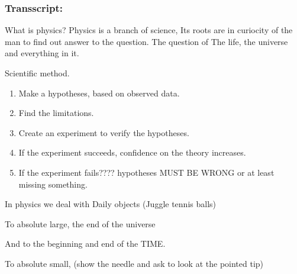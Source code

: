 \documentclass[11pt]{article}
\begin{document}
\subsubsection{Transscript:}
\label{sec:org570568a}

What is physics?
Physics is a branch of science,
Its roots are in curiocity of the man to  find out answer
to the question. The question of The life, the universe and everything in it.

Scientific method.

\begin{enumerate}
\item Make a hypotheses, based on observed data.
\item Find the limitations.
\item Create an experiment to verify the hypotheses.
\item If the experiment succeeds, confidence on the theory increases.
\item If the experiment fails???? hypotheses MUST BE WRONG or at least missing
something.
\end{enumerate}


In physics we deal with
Daily objects (Juggle tennis balls)

To absolute large, the end of the universe

And to the beginning and end of the TIME.

To absolute small,
(show the needle and ask to look at the pointed tip)
\end{document}
